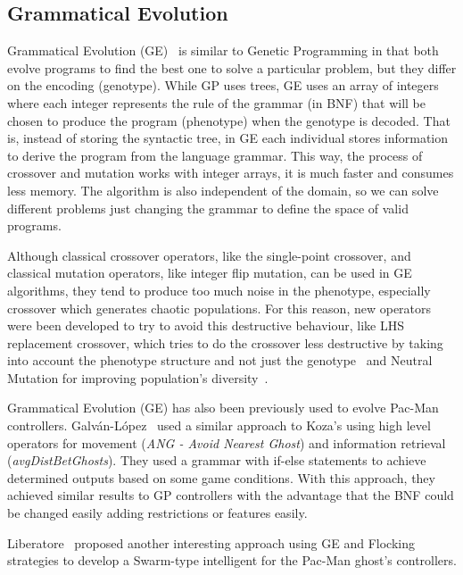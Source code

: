 \documentclass{llncs}
\begin{document}
\subsection{Grammatical Evolution}

Grammatical Evolution (GE)~\cite{o'neill_ryan_2012} is similar to Genetic Programming in that both evolve programs to find the best one to solve a particular problem, but they differ on the encoding (genotype). While GP uses trees, GE uses an array of integers where each integer represents the rule of the grammar (in BNF) that will be chosen to produce the program (phenotype) when the genotype is decoded. That is, instead of storing the syntactic tree, in GE each individual stores information to derive the program from the language grammar. This way, the process of crossover and mutation works with integer arrays, it is much faster and consumes less memory. The algorithm is also independent of the domain, so we can solve different problems just changing the grammar to define the space of valid programs. 

Although classical crossover operators, like the single-point crossover, and classical mutation operators, like integer flip mutation, can be used in GE algorithms, they tend to produce too much noise in the phenotype, especially crossover which generates chaotic populations. For this reason, new operators were been developed to try to avoid this destructive behaviour, like LHS replacement crossover, which tries to do the crossover less destructive by taking into account the phenotype structure and not just the genotype~\cite{harper_blair_2005} and Neutral Mutation for improving population's diversity~\cite{oesch_maringer_2014}.

Grammatical Evolution (GE) has also been previously used to evolve Pac-Man controllers. Galván-López~\cite{galvan2010evolving} used a similar approach to Koza's using high level operators for movement (\textit{ANG - Avoid Nearest Ghost}) and information retrieval (\textit{avgDistBetGhosts}). They used a grammar with if-else statements to achieve determined outputs based on some game conditions. With this approach, they achieved similar results to GP controllers with the advantage that the BNF could be changed easily adding restrictions or features easily. 

Liberatore~\cite{Liberatore2014} proposed another interesting approach using GE and Flocking strategies to develop a Swarm-type intelligent for the Pac-Man ghost's controllers. 

%
\end{document}
